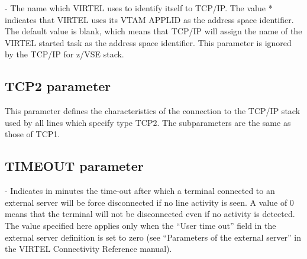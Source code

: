 \documentclass[letterpaper,10pt,english]{sphinxmanual}
\begin{document}
 - The name which VIRTEL uses to identify itself to TCP/IP. The value * indicates that VIRTEL uses its VTAM APPLID as the address space identifier. The default value is blank, which means that TCP/IP will assign the name of the VIRTEL started task as the address space identifier. This parameter is ignored by the TCP/IP for z/VSE stack.


\subsection{TCP2 parameter}
\label{\detokenize{Installation_Guide:tcp2-parameter}}
\begin{sphinxVerbatim}[commandchars=\\\{\}]
    
\PYG{p}{[}\PYG{p}{]}\PYG{p}{[}\PYG{p}{]}\PYG{p}{[}\PYG{p}{]}\PYG{p}{[}\PYG{p}{]}
\end{sphinxVerbatim}

This parameter defines the characteristics of the connection to the TCP/IP stack used by all lines which specify type TCP2. The subparameters are the same as those of TCP1.


\subsection{TIMEOUT parameter}
\label{\detokenize{Installation_Guide:timeout-parameter}}\label{\detokenize{Installation_Guide:index-123}}
\begin{sphinxVerbatim}[commandchars=\\\{\}]
 
\end{sphinxVerbatim}

 - Indicates in minutes the time-out after which a terminal connected to an external server will be force disconnected if no line activity is seen. A value of 0 means that the terminal will not be disconnected even if no activity is detected. The value specified here applies only when the “User time out” field in the external server definition is set to zero (see “Parameters of the external server” in the VIRTEL Connectivity Reference manual).
\end{document}
